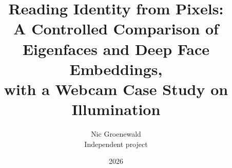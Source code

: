\documentclass[11pt,letterpaper]{article}
\title{\bfseries Reading Identity from Pixels:\\[2pt]
A Controlled Comparison of Eigenfaces and Deep Face Embeddings,\\ with a Webcam Case Study on Illumination}
\author{Nic Groenewald\\\small Independent project}
\date{2026}
\begin{document}
\maketitle

\begin{abstract}

\end{abstract}













\end{document}
